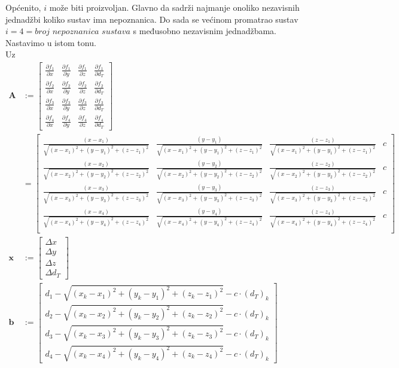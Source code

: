 \documentclass[a4paper,twoside,12pt]{memoir} %
\begin{document}
Općenito, $i$ može biti proizvoljan. 
Glavno da sadrži najmanje onoliko nezavisnih jednadžbi koliko sustav ima nepoznanica.
Do sada se većinom promatrao sustav $i = 4 = \textit{broj nepoznanica sustava}$ s međusobno nezavisnim jednadžbama. Nastavimo u istom tonu.
\\
Uz 
\begin{align}
\mathbf{A} & := \begin{bmatrix}
\frac{\partial f_1}{\partial x} &
\frac{\partial f_1}{\partial y} &
\frac{\partial f_1}{\partial z} &
\frac{\partial f_1}{\partial d_T} \\
\frac{\partial f_2}{\partial x} &
\frac{\partial f_2}{\partial y} &
\frac{\partial f_2}{\partial z} &
\frac{\partial f_2}{\partial d_T} \\
\frac{\partial f_3}{\partial x} &
\frac{\partial f_3}{\partial y} &
\frac{\partial f_3}{\partial z} &
\frac{\partial f_3}{\partial d_T} \\
\frac{\partial f_4}{\partial x} &
\frac{\partial f_4}{\partial y} &
\frac{\partial f_4}{\partial z} &
\frac{\partial f_4}{\partial d_T}
\end{bmatrix} \\
& = \begin{bmatrix}
\frac{(x-x_1)}{\sqrt{(x-x_1)^{2}+(y-y_1)^{2}+(z-z_1)^{2}}} & \frac{(y-y_1)}{\sqrt{(x-x_1)^{2}+(y-y_1)^{2}+(z-z_1)^{2}}} & \frac{(z-z_1)}{\sqrt{(x-x_1)^{2}+(y-y_1)^{2}+(z-z_1)^{2}}} & c \\
\frac{(x-x_2)}{\sqrt{(x-x_2)^{2}+(y-y_2)^{2}+(z-z_2)^{2}}} & \frac{(y-y_2)}{\sqrt{(x-x_2)^{2}+(y-y_2)^{2}+(z-z_2)^{2}}} & \frac{(z-z_2)}{\sqrt{(x-x_2)^{2}+(y-y_2)^{2}+(z-z_2)^{2}}} & c \\
\frac{(x-x_3)}{\sqrt{(x-x_3)^{2}+(y-y_3)^{2}+(z-z_3)^{2}}} & \frac{(y-y_3)}{\sqrt{(x-x_3)^{2}+(y-y_3)^{2}+(z-z_3)^{2}}} & \frac{(z-z_3)}{\sqrt{(x-x_3)^{2}+(y-y_3)^{2}+(z-z_3)^{2}}} & c \\
\frac{(x-x_4)}{\sqrt{(x-x_4)^{2}+(y-y_4)^{2}+(z-z_4)^{2}}} & \frac{(y-y_4)}{\sqrt{(x-x_4)^{2}+(y-y_4)^{2}+(z-z_4)^{2}}} & \frac{(z-z_4)}{\sqrt{(x-x_4)^{2}+(y-y_4)^{2}+(z-z_4)^{2}}} & c \\
\end{bmatrix}\\
\mathbf{x} & :=  \begin{bmatrix}
\Delta x \\
\Delta y \\
\Delta z \\
\Delta d_T
\end{bmatrix}\\
\mathbf{b} & := \begin{bmatrix}
d_1 - \sqrt{(x_k-x_1)^{2}+(y_k-y_1)^{2}+(z_k-z_1)^{2}} - c\cdot (d_T)_k \\
d_2 - \sqrt{(x_k-x_2)^{2}+(y_k-y_2)^{2}+(z_k-z_2)^{2}} - c\cdot (d_T)_k \\
d_3 - \sqrt{(x_k-x_3)^{2}+(y_k-y_3)^{2}+(z_k-z_3)^{2}} - c\cdot (d_T)_k \\
d_4 - \sqrt{(x_k-x_4)^{2}+(y_k-y_4)^{2}+(z_k-z_4)^{2}} - c\cdot (d_T)_k
\end{bmatrix}
\end{align}
\end{document}
